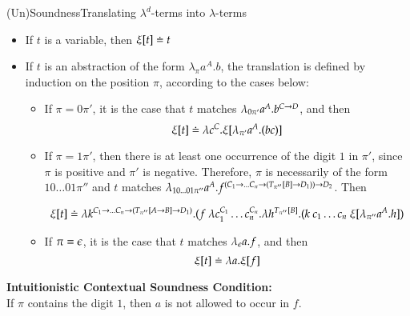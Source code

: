 \documentclass[9pt]{beamer}
\begin{document}
\begin{frame}{(Un)Soundness}{Translating $\lambda^d$-terms into $\lambda$-terms}

\begin{itemize}
\item If $t$ is a variable, then $\xi[t] \doteq t$
%
\item If $t$ is an abstraction of the form $\lambda_{\pi} a^A. b$, the translation is defined by induction on the position $\pi$, according to the cases below:
	\begin{itemize}
	\item If $\pi = 0\pi'$, it is the case that $t$ matches $\lambda_{0\pi'} a^A. b^{C \rightarrow D}$, and then
	$$\xi[t] \doteq \lambda c^C. \xi[\lambda_{\pi'} a^A. (b c)]$$
	\item If $\pi = 1\pi'$, then there is at least one occurrence of the digit $1$ in $\pi'$, since $\pi$ is positive and $\pi'$ is negative. Therefore, $\pi$ is necessarily of the form $10\ldots01\pi''$ and $t$ matches $\lambda_{10\ldots01\pi''} a^A. f^{(C_1 \rightarrow \ldots C_n \rightarrow (T_{\pi''}[B] \rightarrow D_1)) \rightarrow D_2}$. Then
	\begin{scriptsize}
	\alert{$$\xi[t] \doteq \lambda k^{C_1 \rightarrow \ldots C_n \rightarrow (T_{\pi''}[A \rightarrow B] \rightarrow D_1)}. (f \ \lambda c_1^{C_1} \ldots c_n^{C_n}. \lambda h^{T_{\pi''}[B]}. (k \ c_1 \ldots c_n \ \xi[\lambda_{\pi''} a^A. h])$$}
	\end{scriptsize}
	\item If $\pi = \epsilon$, it is the case that $t$ matches $\lambda_{\epsilon} a. f$, and then
	$$\xi[t] \doteq \lambda a. \xi[f]$$
	\end{itemize}
\end{itemize}

\begin{center}
\alert{
\textbf{Intuitionistic Contextual Soundness Condition:} \\
If $\pi$ contains the digit $1$, then $a$ is not allowed to occur in $f$.
}
\end{center}
\end{frame}
\end{document}
